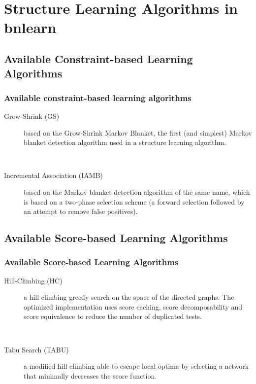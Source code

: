 \documentclass{beamer}
\begin{document}
\section{Structure Learning Algorithms in bnlearn}
\subsection{Available Constraint-based Learning Algorithms}
\begin{frame}
\frametitle{Available constraint-based learning algorithms}
{\scriptsize{}
\begin{description}
\item[Grow-Shrink (GS)] based on the Grow-Shrink Markov Blanket, the first (and simplest) Markov blanket detection algorithm used in a structure learning algorithm.

{}\

\item[Incremental Association (IAMB)] based on the Markov blanket detection algorithm of the same name, which is based on a two-phase selection scheme (a forward selection followed by an attempt to remove false positives).
\end{description}
}
\end{frame}


\subsection{Available Score-based Learning Algorithms}
\begin{frame}
\frametitle{Available Score-based Learning Algorithms}
{\scriptsize{}
\begin{description}
\item[Hill-Climbing (HC)] a hill climbing greedy search on the space of the directed graphs. The optimized implementation uses score caching, score decomposability and score equivalence to reduce the number of duplicated tests.

{}\

\item[Tabu Search (TABU)] a modified hill climbing able to escape local optima by selecting a network that minimally decreases the score function.
\end{description}
}
\end{frame}
\end{document}
